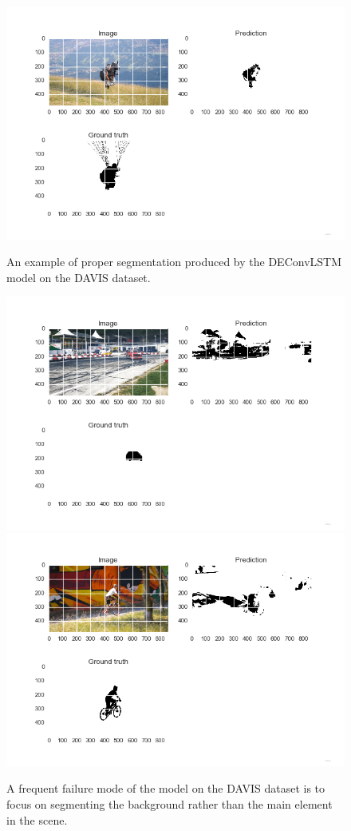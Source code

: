 \begin{figure}[t!]
    \centering
    \includegraphics[trim={0 15mm 0 0},width=0.9\columnwidth]{img/deconvLSTM/paragliding-0.png}\\
    \caption{An example of proper segmentation produced by the DEConvLSTM model
        on the DAVIS dataset.}
    \label{fig:deconvlstm_davis_sample}
\end{figure}

\begin{figure}[t!]
    \centering
    \includegraphics[trim={0 15mm 0 0},width=0.8\columnwidth]{img/deconvLSTM/drift-0.png}\\
    \includegraphics[trim={0 15mm 0 0},width=0.8\columnwidth]{img/deconvLSTM/bmx-trees-0.png}
    \caption{A frequent failure mode of the model on the DAVIS dataset is to
        focus on segmenting the background rather than the main element in the
        scene.}
    \label{fig:deconvlstm_davis_failure}
\end{figure}


